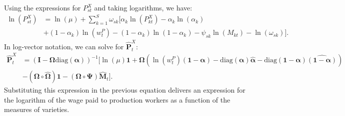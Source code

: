 \documentclass[12pt]{article}
\begin{document}
Using the expressions for $P_{st}^X$ and taking logarithms, we have:
\begin{align*}
    \ln(P_{st}^X) &= \ln(\mu) + \sum_{k = 1}^S \omega_{sk} [\alpha_k \ln(P_{kt}^X) - \alpha_k \ln(\alpha_k) \\
    &+ (1 - \alpha_k) \ln(w_t^P) - (1 - \alpha_k) \ln(1 - \alpha_k) - \psi_{sk} \ln(M_{kt}) - \ln(\omega_{sk})].
\end{align*}
In log-vector notation, we can solve for $\hat{\mathbf{P}}_t^X$:
\begin{align*}
    \hat{\mathbf{P}}_t^X &= (\mathbf{I} - \bm{\Omega} \text{diag}(\bm{\alpha}))^{-1} [\ln(\mu) \mathbf{1} + \bm{\Omega} (\ln(w_t^P) (\mathbf{1} - \bm{\alpha}) - \text{diag}(\bm{\alpha}) \hat{\bm{\alpha}} - \text{diag}(\mathbf{1} - \bm{\alpha}) \widehat{(\mathbf{1} - \bm{\alpha})}) \\
    &- (\bm{\Omega} \circ \hat{\bm{\Omega}}) \mathbf{1} - (\bm{\Omega} \circ \bm{\Psi}) \hat{\mathbf{M}}_t].
\end{align*}
Substituting this expression in the previous equation delivers an expression for the logarithm of the wage paid to production workers as a function of the measures of varieties.
\end{document}
